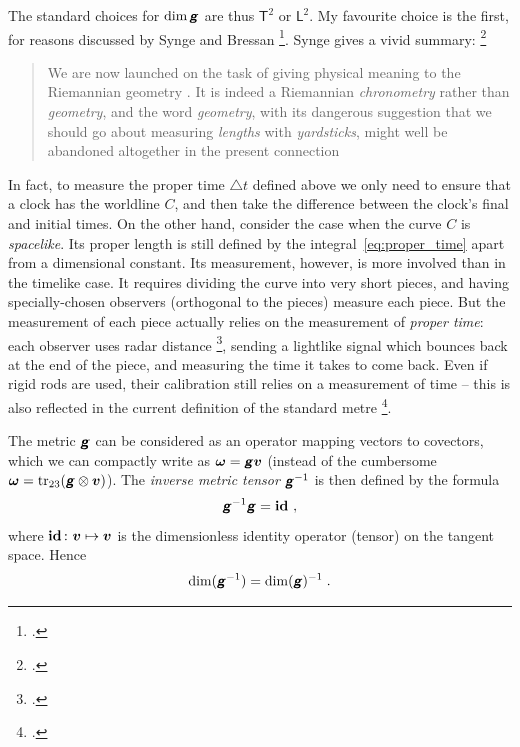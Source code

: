 \documentclass[\ifafour a4paper,12pt,\else a5paper,10pt,\fi%
onecolumn,oneside,article,%
british%
]{memoir}
\makeatletter
\theoremstyle{remark}
\theoremstyle{innote}
\newcommand*{\mathte}[1]{\textbf{\textit{\textsf{#1}}}}
\newcommand*{\citep}{\footcites}
\DeclareMathOperator{\tr}{tr}%
\newcommand*{\incr}{\triangle}%
\newcommand*{\defd}{\coloneqq}
\renewcommand*{\|}[1][]{\nonscript\,#1\vert\nonscript\;\mathopen{}}
\newcommand*{\sect}{\S}%
\newcommand*{\sects}{\S\S}%
\newcommand*{\q}{}%
\DeclareRobustCommand*{\q}{%
  \mathbin{\mathpalette\bigcdot@{}}%
}
\newcommand*{\bigcdot@scalefactor}{0.7}
\newcommand*{\bigcdot@widthfactor}{1.5}
\newcommand*{\bigcdot@}[2]{%
  \sbox0{$#1\vcenter{}$}%
  \sbox2{$#1\cdot\m@th$}%
  \hbox to \bigcdot@widthfactor\wd2{%
    \hfil
    \raise\ht0\hbox{%
      \scalebox{\bigcdot@scalefactor}{%
        \lower\ht0\hbox{$#1\bullet\m@th$}%
      }%
    }%
    \hfil
  }%
}
\newcommand*{\Un}{\textsf{1}}
\newcommand*{\Le}{\textsf{L}}
\newcommand*{\Ti}{\textsf{T}}
\newcommand*{\yg}{\mathte{g}}
\newcommand*{\yom}{\bm{\omega}}
\newcommand*{\yv}{\bm{v}}
\renewcommand*{\i}{\indices}
\newcommand*{\inct}{\incr t}
\newcommand*{\id}{\mathbf{id}}%
\makeatother
\begin{document}
The standard choices for $\dim{\yg}$ are thus $\Ti^{2}$ or $\Le^{2}$. My
favourite choice is the first, for reasons discussed by Synge and Bressan
\citep[\sects~III.2--4]{synge1960b}[\sects~15, 18]{bressan1978}. Synge
gives a vivid summary: \citep[\sect~III.3 pp.~108--109]{synge1960b}
\begin{quote}\footnotesize
  We are now launched on the task of giving physical meaning to the
  Riemannian geometry \textelp{}. It is indeed a Riemannian
  \emph{chronometry} rather than \emph{geometry}, and the word
  \emph{geometry}, with its dangerous suggestion that we should go about
  measuring \emph{lengths} with \emph{yardsticks}, might well be abandoned
  altogether in the present connection
\end{quote}
In fact, to measure the proper time $\inct$ defined above we only need to
ensure that a clock has the worldline $C$, and then take the difference
between the clock's final and initial times. On the other hand, consider
the case when the curve $C$ is \emph{spacelike}. Its proper length is still
defined by the integral~\eqref{eq:proper_time} apart from a dimensional
constant. Its measurement, however, is more involved than in the timelike
case. It requires dividing the curve into very short pieces, and having
specially-chosen observers (orthogonal to the pieces) measure each piece.
But the measurement of each piece actually relies on the measurement of
\emph{proper time}: each observer uses radar distance
\citep[\sect~84]{landauetal1939_t1996}, sending a lightlike signal which
bounces back at the end of the piece, and measuring the time it takes to
come back. Even if rigid rods are used, their calibration still relies on a
measurement of time -- this is also reflected in the current definition of
the standard metre \citep[p.~98]{bipm1983}[p.~25]{giacomo1984}.


\medskip

The metric $\yg$ can be considered as an operator mapping vectors to
covectors, which we can compactly write as $\yom=\yg\yv$ (instead of the cumbersome
$\yom = \tr_{23}(\yg\otimes\yv)$). The \emph{inverse metric tensor}
$\yg\i{^{-1}^{\q\q}}$ is then defined by the formula
\begin{equation}
  \label{eq:inverse_g}
  \yg^{-1}\yg = \id\i{^{\q}_{\q}} \;,
\end{equation}
where $\id\i{^{\q}_{\q}}\colon \bm{v} \mapsto \bm{v}$ is the dimensionless
identity operator (tensor) on the tangent space. Hence
\begin{equation}
  \label{eq:dim_ig}
  \dim(\yg^{-1}) = \dim(\yg)^{-1} \;.
\end{equation}
\end{document}

